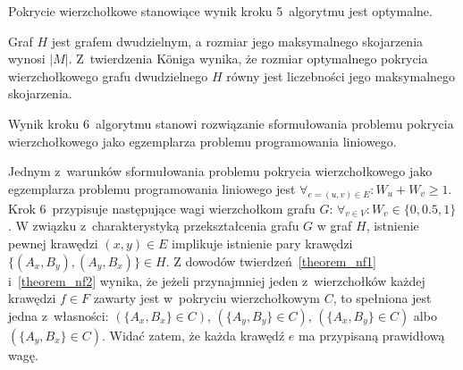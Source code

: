 \begin{theorem}\label{theorem_nf2}
  Pokrycie wierzchołkowe stanowiące wynik kroku 5\ algorytmu jest optymalne.
\end{theorem}
\begin{bproof}
  Graf $H$ jest grafem dwudzielnym, a rozmiar jego maksymalnego skojarzenia wynosi $|M|$.
  Z~twierdzenia K\"oniga wynika, że rozmiar optymalnego pokrycia wierzchołkowego grafu dwudzielnego $H$ równy jest liczebności jego maksymalnego skojarzenia.
\end{bproof}
\begin{theorem}
  Wynik kroku 6~algorytmu stanowi rozwiązanie sformułowania problemu pokrycia wierzchołkowego jako egzemplarza problemu programowania liniowego.
\end{theorem}
\begin{bproof}
  Jednym z~warunków sformułowania problemu pokrycia wierzchołkowego jako egzemplarza problemu programowania liniowego jest $\forall_{e=(u,v) \in E}: W_u + W_v \geq 1$.
  Krok 6\ przypisuje następujące wagi wierzchołkom grafu $G$: $\forall_{v \in V}: W_v \in \{0, 0.5, 1\}$.
  W związku z~charakterystyką przekształcenia grafu $G$ w graf $H$, istnienie pewnej krawędzi $(x,y) \in E$ implikuje istnienie pary krawędzi $\{(A_x, B_y), (A_y, B_x)\} \in H$.
  Z dowodów twierdzeń~\ref{theorem_nf1} i~\ref{theorem_nf2} wynika, że jeżeli przynajmniej jeden z~wierzchołków każdej krawędzi $f \in F$ zawarty jest w~pokryciu wierzchołkowym $C$, to spełniona jest jedna z~własności: $(\{A_x, B_x\} \in C)$, $(\{A_y, B_y\} \in C)$, $(\{A_x, B_y\} \in C)$ albo $(\{A_y, B_x\} \in C)$.
  Widać zatem, że każda krawędź $e$ ma przypisaną prawidłową wagę.
\end{bproof}
